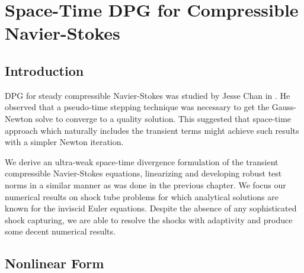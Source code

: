 \documentclass[Dissertation.tex]{subfiles}
\begin{document}
\graphicspath{{../Figures/}}
\chapter{Space-Time DPG for Compressible Navier-Stokes}
\label{sec:compressible}

\section{Introduction}
DPG for steady compressible Navier-Stokes was studied by Jesse Chan in \cite{JesseDissertation}.
He observed that a pseudo-time stepping technique was necessary to get the Gauss-Newton solve to converge 
to a quality solution.
This suggested that space-time approach which naturally includes the transient terms
might achieve such results with a simpler Newton iteration.

We derive an ultra-weak space-time divergence formulation of the transient compressible Navier-Stokes equations,
linearizing and developing robust test norms in a similar manner as was done in the previous chapter.
We focus our numerical results on shock tube problems for which analytical solutions are known for the 
inviscid Euler equations.
Despite the absence of any sophisticated shock capturing, we are able to resolve the shocks with adaptivity 
and produce some decent numerical results.

\section{Nonlinear Form}
\end{document}
